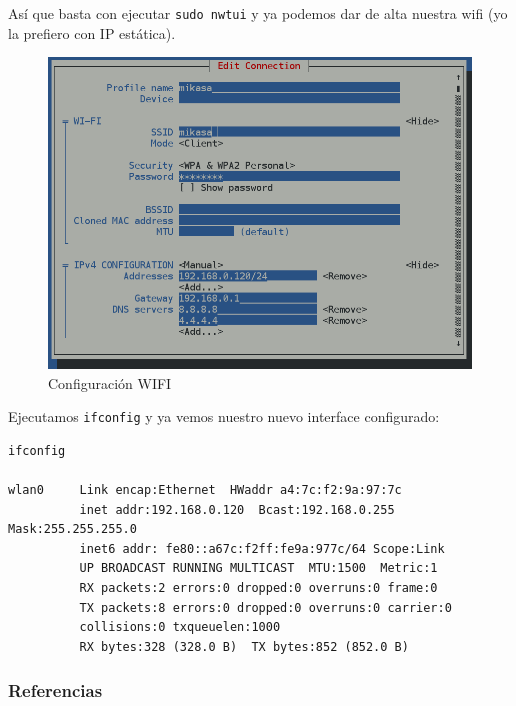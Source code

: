 \documentclass[12pt,spanish,]{article}
\begin{document}
Así que basta con ejecutar \texttt{sudo\ nwtui} y ya podemos dar de alta
nuestra wifi (yo la prefiero con IP estática).

\begin{figure}[htbp]
\centering
\includegraphics{src/img/OrangePiZero_tmtui.png}
\caption{Configuración WIFI}
\end{figure}

Ejecutamos \texttt{ifconfig} y ya vemos nuestro nuevo interface
configurado:

\begin{verbatim}
ifconfig

wlan0     Link encap:Ethernet  HWaddr a4:7c:f2:9a:97:7c
          inet addr:192.168.0.120  Bcast:192.168.0.255  Mask:255.255.255.0
          inet6 addr: fe80::a67c:f2ff:fe9a:977c/64 Scope:Link
          UP BROADCAST RUNNING MULTICAST  MTU:1500  Metric:1
          RX packets:2 errors:0 dropped:0 overruns:0 frame:0
          TX packets:8 errors:0 dropped:0 overruns:0 carrier:0
          collisions:0 txqueuelen:1000
          RX bytes:328 (328.0 B)  TX bytes:852 (852.0 B)
\end{verbatim}

\subsubsection{Referencias}\label{referencias-1}
\end{document}
